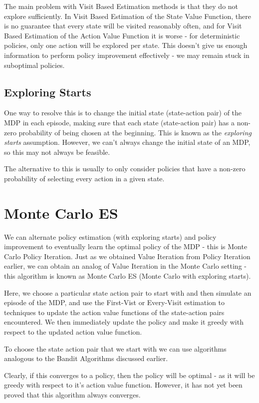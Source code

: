 \documentclass[12pt]{report}
\begin{document}
The main problem with Visit Based Estimation methods is that they do not explore sufficiently. In Visit Based Estimation of the State Value Function, there is no guarantee that every state will be visited reasonably often, and for Visit Based Estimation of the Action Value Function it is worse - for deterministic policies, only one action will be explored per state. This doesn't give us enough information to perform policy improvement effectively - we may remain stuck in suboptimal policies.

\subsection{Exploring Starts}
One way to resolve this is to change the initial state (state-action pair) of the MDP in each episode, making sure that each state (state-action pair) has a non-zero probability of being chosen at the beginning. This is known as the \textit{exploring starts} assumption. However, we can't always change the initial state of an MDP, so this may not always be feasible.

The alternative to this is usually to only consider policies that have a non-zero probability of selecting every action in a given state. 

\section{Monte Carlo ES}
We can alternate policy estimation (with exploring starts) and policy improvement to eventually learn the optimal policy of the MDP - this is Monte Carlo Policy Iteration. Just as we obtained Value Iteration from Policy Iteration earlier, we can obtain an analog of Value Iteration in the Monte Carlo setting - this algorithm is known as Monte Carlo ES (Monte Carlo with exploring starts).

Here, we choose a particular state action pair to start with and then simulate an episode of the MDP, and use the First-Vist or Every-Visit estimation to techniques to update the action value functions of the state-action pairs encountered. We then immediately update the policy and make it greedy with respect to the updated action value function. 

To choose the state action pair that we start with we can use algorithms analogous to the Bandit Algorithms discussed earlier.

Clearly, if this converges to a policy, then the policy will be optimal - as it will be greedy with respect to it's action value function. However, it has not yet been proved that this algorithm always converges.
\end{document}
